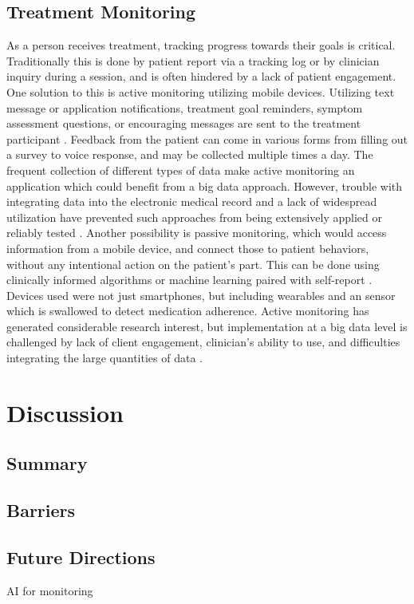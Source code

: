 \documentclass[sigconf]{acmart}
\begin{document}
\subsection{Treatment Monitoring}
As a person receives treatment, tracking progress towards their goals is critical. Traditionally this is done by patient report via a tracking log or by clinician inquiry during a session, and is often hindered by a lack of patient engagement. One solution to this is active monitoring utilizing mobile devices. Utilizing text message or application notifications, treatment goal reminders, symptom assessment questions, or encouraging messages are sent to the treatment participant \cite{bitreview}. Feedback from the patient can come in various forms from filling out a survey  to voice response, and may be collected multiple times a day. The frequent collection of different types of data make active monitoring an application which could benefit from a big data approach. However, trouble with integrating data into the electronic medical record and a lack of widespread utilization have prevented such approaches from being extensively applied or reliably tested \cite{bigdatabipolar}.
Another possibility is passive monitoring, which would access information from a mobile device, and connect those to patient behaviors, without any intentional action on the patient's part. This can be done using clinically informed algorithms or machine learning paired with self-report \cite{bitreview}. Devices used were not just smartphones, but including wearables and an sensor which is swallowed to detect medication adherence. Active monitoring has generated considerable research interest, but implementation at a big data level is challenged by lack of client engagement, clinician's ability to use, and difficulties integrating the large quantities of data \cite{bigdatabipolar}. 
\section{Discussion}
\subsection{Summary}

\subsection{Barriers}


\subsection{Future Directions}
AI for monitoring
\end{document}
